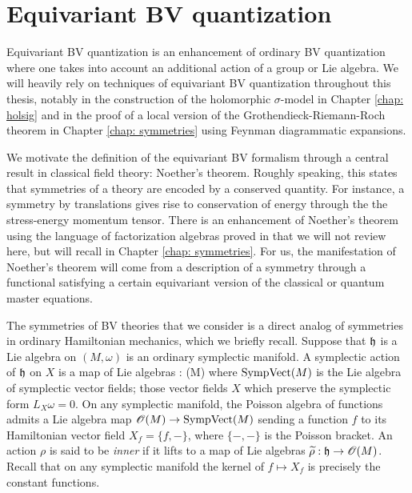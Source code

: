 \section{Equivariant BV quantization} \label{sec: equiv BV}

Equivariant BV quantization is an enhancement of ordinary BV quantization where one takes into account an additional action of a group or Lie algebra. 
We will heavily rely on techniques of equivariant BV quantization throughout this thesis, notably in the construction of the holomorphic $\sigma$-model in Chapter \ref{chap: holsig} and in the proof of a local version of the Grothendieck-Riemann-Roch theorem in Chapter \ref{chap: symmetries} using Feynman diagrammatic expansions.

We motivate the definition of the equivariant BV formalism through a central result in classical field theory: Noether's theorem.
Roughly speaking, this states that symmetries of a theory are encoded by a conserved quantity. 
For instance, a symmetry by translations gives rise to conservation of energy through the the stress-energy momentum tensor. 
There is an enhancement of Noether's theorem using the language of factorization algebras proved in \cite{CG2} that we will not review here, but will recall in Chapter \ref{chap: symmetries}. 
For us, the manifestation of Noether's theorem will come from a description of a symmetry through a functional satisfying a certain equivariant version of the classical or quantum master equations. 

The symmetries of BV theories that we consider is a direct analog of symmetries in ordinary Hamiltonian mechanics, which we briefly recall. 
Suppose that $\mathfrak h$ is a Lie algebra on $(M,\omega)$ is an ordinary symplectic manifold. 
A symplectic action of $\mathfrak h$ on $X$ is a map of Lie algebras 
\ben
\rho : \fh {}(M)
\een
where ${\rm SympVect}(M)$ is the Lie algebra of symplectic vector fields; those vector fields $X$ which preserve the symplectic form $L_X \omega = 0$.
On any symplectic manifold, the Poisson algebra of functions admits a Lie algebra map $\mathscr O(M) \to {\rm SympVect}(M)$ sending a function $f$ to its Hamiltonian vector field $X_f = \{f,-\}$, where $\{-,-\}$ is the Poisson bracket.
An action $\rho$ is said to be {\em inner} if it lifts to a map of Lie algebras $\widetilde{\rho} : \mathfrak h \to \mathscr O(M)$. 
Recall that on any symplectic manifold the kernel of $f \mapsto X_f$ is precisely the constant functions. 

